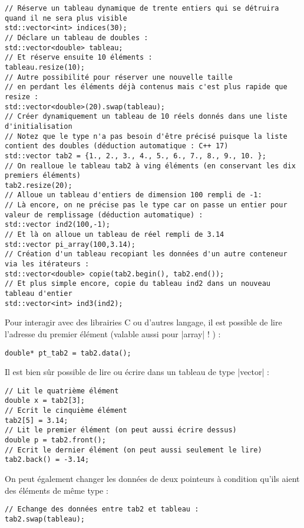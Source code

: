\begin{lstlisting}
// Réserve un tableau dynamique de trente entiers qui se détruira quand il ne sera plus visible
std::vector<int> indices(30); 
// Déclare un tableau de doubles :
std::vector<double> tableau;
// Et réserve ensuite 10 éléments :
tableau.resize(10);
// Autre possibilité pour réserver une nouvelle taille
// en perdant les éléments déjà contenus mais c'est plus rapide que resize :
std::vector<double>(20).swap(tableau);
// Créer dynamiquement un tableau de 10 réels donnés dans une liste d'initialisation
// Notez que le type n'a pas besoin d'être précisé puisque la liste contient des doubles (déduction automatique : C++ 17)
std::vector tab2 = {1., 2., 3., 4., 5., 6., 7., 8., 9., 10. };
// On realloue le tableau tab2 à ving éléments (en conservant les dix premiers éléments)
tab2.resize(20);
// Alloue un tableau d'entiers de dimension 100 rempli de -1:
// Là encore, on ne précise pas le type car on passe un entier pour valeur de remplissage (déduction automatique) :
std::vector ind2(100,-1);
// Et là on alloue un tableau de réel rempli de 3.14
std::vector pi_array(100,3.14);
// Création d'un tableau recopiant les données d'un autre conteneur via les itérateurs :
std::vector<double> copie(tab2.begin(), tab2.end());
// Et plus simple encore, copie du tableau ind2 dans un nouveau tableau d'entier
std::vector<int> ind3(ind2);
\end{lstlisting}

Pour interagir avec des librairies C ou d'autres langage, il est possible de lire l'adresse du premier élément (valable aussi pour |array| ! ) :
\begin{lstlisting}
double* pt_tab2 = tab2.data();
\end{lstlisting}

Il est bien sûr possible de lire ou écrire dans un tableau de type |vector| :
\begin{lstlisting}
// Lit le quatrième élément
double x = tab2[3];
// Ecrit le cinquième élément
tab2[5] = 3.14;
// Lit le premier élément (on peut aussi écrire dessus)
double p = tab2.front();
// Ecrit le dernier élément (on peut aussi seulement le lire)
tab2.back() = -3.14;
\end{lstlisting}

On peut également changer les données de deux pointeurs à condition qu'ils aient des éléments de même type :
\begin{lstlisting}
// Echange des données entre tab2 et tableau :
tab2.swap(tableau);
\end{lstlisting}

